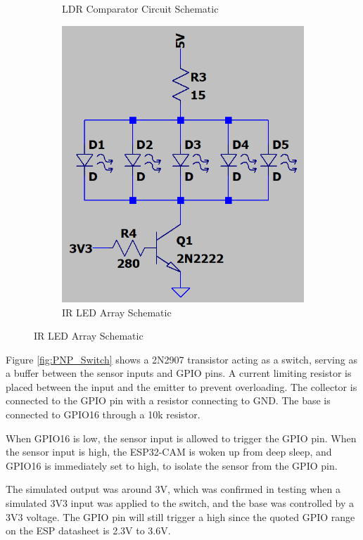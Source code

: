 \documentclass[class=report,11pt,crop=false]{standalone}
\begin{document}
\begin{figure}[hbt!]
\begin{subfigure}[b]{0.4\textwidth}
        \caption{LDR Comparator Circuit Schematic}
        \label{fig:LDR_schem}
    \end{subfigure}
    \hfill
    \begin{subfigure}[b]{0.25\textwidth}
        \includegraphics[width=\linewidth]{Images/IR_LED_Array.png}
        \caption{IR LED Array Schematic}
        \label{fig:LED_schem}
    \end{subfigure}
\end{figure}

Figure \ref{fig:PNP_Switch} shows a 2N2907 transistor acting as a switch, serving as a buffer between the sensor inputs and GPIO pins. A current limiting resistor is placed between the input and the emitter to prevent overloading. The collector is connected to the GPIO pin with a resistor connecting to GND. The base is connected to GPIO16 through a 10k resistor. 

When GPIO16 is low, the sensor input is allowed to trigger the GPIO pin. When the sensor input is high, the ESP32-CAM is woken up from deep sleep, and GPIO16 is immediately set to high, to isolate the sensor from the GPIO pin. 

The simulated output was around 3V, which was confirmed in testing when a simulated 3V3 input was applied to the switch, and the base was controlled by a 3V3 voltage. The GPIO pin will still trigger a high since the quoted GPIO range on the ESP datasheet is 2.3V to 3.6V. 
\end{document}
